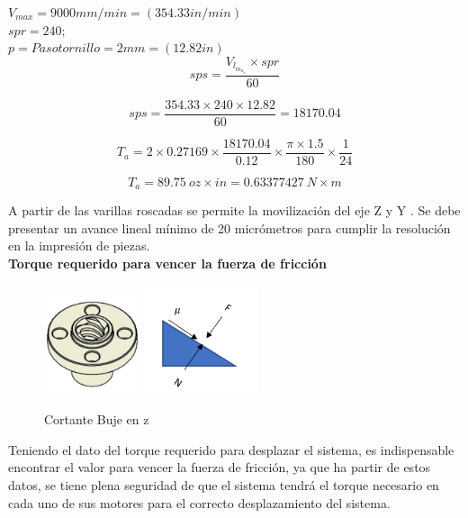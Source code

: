 $V_{max}=9000mm/min=(354.33in/min)$\\
$spr=240;$\\
$p=Paso tornillo=2mm=(12.82in)$\\

\begin{equation}
sps=\frac{V_l_m_a_x\times spr}{60}
\label{eq:13}
\end{equation}

\begin{equation}
sps=\frac{354.33\times240\times12.82}{60}=18170.04
\label{eq:13}
\end{equation}

\begin{equation}
T_a=2\times0.27169\times\frac{18170.04}{0.12}\times\frac{\pi\times1.5}{180}\times\frac{1}{24}
\label{eq:13}
\end{equation}

\[T_a=89.75\: oz\times in =0.63377427\: N\times m\]

A partir de las varillas roscadas se permite la movilización del eje Z y Y . Se debe presentar un avance lineal mínimo de 20 micrómetros para cumplir la resolución en la impresión de piezas.\\

\textbf{Torque requerido para vencer la fuerza de fricción}

\begin{figure}[H]
 \centering
  {
    \includegraphics[width=0.25\textwidth]{ejez.png}}
  {
    \includegraphics[width=0.3\textwidth]{TRI_CALCULOS.PNG}
    }
 \caption{Cortante Buje en z}
 \label{f:animales}
\end{figure}


Teniendo el dato del torque requerido para desplazar el sistema, es indispensable encontrar el valor para vencer la fuerza de fricción, ya que ha partir de estos datos, se tiene plena seguridad de que el sistema tendrá el torque necesario en cada uno de sus motores para el correcto desplazamiento del sistema.\\

